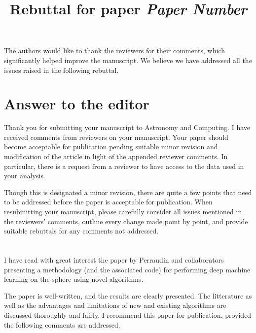 \documentclass[12pt,a4paper]{article}
\title{\vspace{-1cm}
\begin{flushleft} {\sffamily Rebuttal for paper \emph{Paper Number} }\end{flushleft}}
\date{\vspace{-1.7cm}\begin{flushleft}\sffamily DeepSphere: Efficient spherical Convolutional Neural Network with HEALPix sampling for cosmological applications, Nathanaël Perraudin, Michaël Defferrard, Tomasz Kacprzak, Raphael Sgier \end{flushleft}}
\newcommand{\todo}[1]{{\color[rgb]{.6,.1,.6}{TODO: #1}}}
\newcommand{\1}{\b{1}}              %
\newcommand{\0}{\b{0}}              %
\begin{document}
\maketitle


The authors would like to thank the reviewers for their comments, which significantly helped improve the manuscript. We believe we have addressed all the issues raised in the following rebuttal.

\section*{Answer to the editor}


\begin{mdframed}[style=comment]
Thank you for submitting your manuscript to Astronomy and Computing. I have received comments from reviewers on your manuscript. Your paper should become acceptable for publication pending suitable minor revision and modification of the article in light of the appended reviewer comments.  In particular, there is a request from a reviewer to have access to the data used in your analysis.

Though this is designated a minor revision, there are quite a few points that need to be addressed before the paper is acceptable for publication.  When resubmitting your manuscript, please carefully consider all issues mentioned in the reviewers' comments, outline every change made point by point, and provide suitable rebuttals for any comments not addressed.
\end{mdframed}

\todo{Answer to editor}

\section{}

\subsection{}

\begin{mdframed}[style=comment]
I have read with great interest the paper by Perraudin and collaborators presenting a methodology (and the associated code) for performing deep machine learning on the sphere using novel algorithms.

The paper is well-written, and the results are clearly presented. The litterature as well as the advantages and limitations of new and existing algorithms are discussed thoroughly and fairly. I recommend this paper for publication, provided the following comments are addressed.
\end{mdframed}
\end{document}
